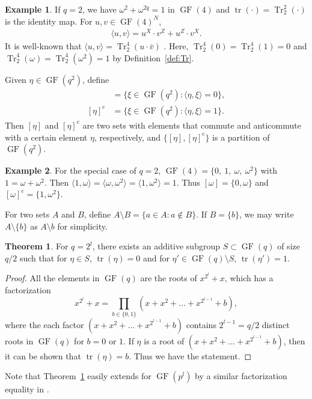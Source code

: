 \documentclass{ieeeaccess}
\DeclareMathOperator{\GF}{GF}
\DeclareMathOperator{\tr}{tr}
\DeclareMathOperator{\Tr}{Tr}
\theoremstyle{definition}		%
\newtheorem{definition}{Definition}
\newtheorem{theorem}{Theorem}
\newtheorem{example}{Example}
\begin{document}
\begin{example} \label{ex:q=2}
	If $q=2$, we have $\omega^2 + \omega^{2q} = 1$ in $\GF(4)$ and $\tr(\cdot)=\Tr_2^2(\cdot)$ is the identity map. 
		For $u,v\in\GF(4)^N$,
		\begin{align*}
		\langle u,v \rangle = u^X\cdot v^Z + u^Z\cdot v^X.
		\end{align*}
	It is well-known that $\langle u,v \rangle = \Tr^4_2(u\cdot \bar v)$ \cite{CRSS98}. 
	Here, $\Tr^4_2(0)=\Tr^4_2(1)=0$ and $\Tr^4_2(\omega)=\Tr^4_2(\omega^2)=1$ by Definition~\ref{def:Tr}.
\end{example}





	Given   $\eta \in \GF(q^2)$, define
	\begin{align*}
	[\eta] \,\, &= \{\xi\in\GF(q^2) : \langle \eta ,\xi\rangle = 0 \}, \\
	[\eta]^{\text{c}} &= \{\xi\in\GF(q^2) : \langle \eta ,\xi\rangle = 1 \}.
	\end{align*}
Then $ [\eta]$ and  $[\eta]^{\text{c}}$ are two sets with elements that commute and anticommute with a certain element $\eta$, respectively, and $\{[\eta], [\eta]^{\text{c}} \}$ is a partition of  $\GF(q^2)$. 
%
\begin{example} \label{ex:q^2=4}
	For the special case of $q=2$, $\GF(4)=\{0,~ 1,~\omega,~\omega^2\}$ with $1=\omega+\omega^2$. 
	Then $\langle 1,\omega \rangle= \langle \omega,\omega^2 \rangle=\langle 1,\omega^2 \rangle=1$.
	Thus $[\omega]= \{0,\omega\}$ and $[{\omega}]^{\text{c}}= \{1,\omega^2\}$.
\end{example} 


	For two sets $A$ and $B$, define $A\setminus B = \{a\in A: a\notin B\}$. 
	If $B=\{b\}$, we may write $A\setminus\{b\}$ as $A\setminus b$ for simplicity.





\begin{theorem} \label{thm:tr_0.5}
	For $q=2^l$,  there exists an additive subgroup $S\subset \GF(q)$ of size $q/2$ such that  for {$\eta\in S$}, $\tr(\eta)=0$ and
	for $\eta' \in \GF(q)\setminus S$, $\tr(\eta')=1$.
\end{theorem}
\begin{proof}
	All the elements in \mbox{$\GF(q)$} are the roots of $x^{2^l}+x$, which has a factorization 
	$$x^{2^l}+x = \textstyle \prod_{b\in\{0,1\}}(x + x^2 + \dots + x^{2^{l-1}} + b),$$
	where the each factor $(x + x^2 + \dots + x^{2^{l-1}} 
	+ b)$ contains $2^{l-1} = q/2$ distinct roots in $\GF(q)$ for $b=0$ or $1$.
	If $\eta$ is a root of  $(x + x^2 + \dots + x^{2^{l-1}} 
	+ b)$, then it can be shown that  $\tr(\eta)=b$. 
Thus we have the statement.
\end{proof}
{Note that Theorem~\ref{thm:tr_0.5} easily extends for $\GF(p^l)$ by a similar factorization equality in \cite[Theorem 8.1(e)]{McE87}.}
\end{document}
